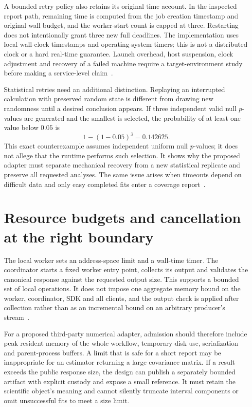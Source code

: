 A bounded retry policy also retains its original time account. In the
inspected report path, remaining time is computed from the job creation
timestamp and original wall budget, and the worker-start count is capped at
three. Restarting does not intentionally grant three new full deadlines.
The implementation uses local wall-clock timestamps and operating-system
timers; this is not a distributed clock or a hard real-time guarantee.
Launch overhead, host suspension, clock adjustment and recovery of a failed
machine require a target-environment study before making a service-level
claim~\citep{exec13_ops_source}.

Statistical retries need an additional distinction. Replaying an interrupted
calculation with preserved random state is different from drawing new
randomness until a desired conclusion appears. If three independent valid
null $p$-values are generated and the smallest is selected, the probability
of at least one value below $0.05$ is
\[
 1-(1-0.05)^3=0.142625.
\]
This exact counterexample assumes independent uniform null $p$-values;
it does not allege that the runtime performs such selection. It shows why
the proposed adapter must separate mechanical recovery from a new statistical
replicate and preserve all requested analyses. The same issue arises when
timeouts depend on difficult data and only easy completed fits enter a
coverage report~\citep{exec13_ops_exact}.

\section{Resource budgets and cancellation at the right boundary}

The local worker sets an address-space limit and a wall-time timer. The
coordinator starts a fixed worker entry point, collects its output and
validates the canonical response against the requested output size. This
supports a bounded set of local operations. It does not impose one aggregate
memory bound on the worker, coordinator, SDK and all clients, and the output
check is applied after collection rather than as an incremental bound on an
arbitrary producer's stream~\citep{exec13_ops_source}.

For a proposed third-party numerical adapter, admission should therefore
include peak resident memory of the whole workflow, temporary disk use,
serialization and parent-process buffers. A limit that is safe for a short
report may be inappropriate for an estimator returning a large covariance
matrix. If a result exceeds the public response size, the design can publish
a separately bounded artifact with explicit custody and expose a small
reference. It must retain the scientific object's meaning and cannot silently
truncate interval components or omit unsuccessful fits to meet a size limit.

